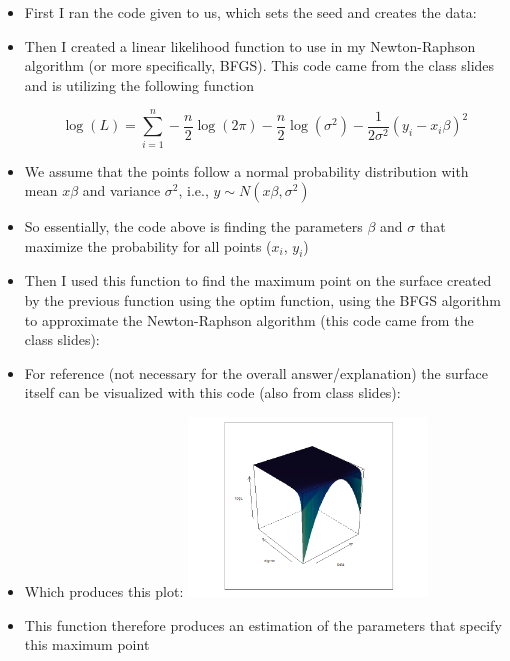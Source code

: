 \documentclass[12pt,letterpaper]{article}
\begin{document}
\begin{itemize}
	\item First I ran the code given to us, which sets the seed and creates the data:
	
	\item Then I created a linear likelihood function to use in my Newton-Raphson algorithm (or more specifically, BFGS). This code came from the class slides and is utilizing the following function


\[
\log(L) = \sum_{i=1}^{n} -\frac{n}{2} \log(2\pi) - \frac{n}{2} \log(\sigma^2) - \frac{1}{2\sigma^2}  (y_i - x_i \beta)^2
\]

	

	\item We assume that the points follow a normal probability distribution with mean $x\beta$ and variance $\sigma^2$, i.e., $y \sim N(x\beta, \sigma^2)$
	\item So essentially, the code above is finding the parameters $\beta$ and $\sigma$ that maximize the probability for all points ($x_i$, $y_i$)
	
	

	\item Then I used this function to find the maximum point on the surface created by the previous function using the optim function, using the BFGS algorithm to approximate the Newton-Raphson algorithm (this code came from the class slides):
	
	\item For reference (not necessary for the overall answer/explanation) the surface itself can be visualized with this code (also from class slides):
		
		\item Which produces this plot:
		\newline 
		\includegraphics[width=0.5\textwidth]{plot.png}
	\item This function therefore produces an estimation of the parameters that specify this maximum point 
	

\end{itemize}
\end{document}
